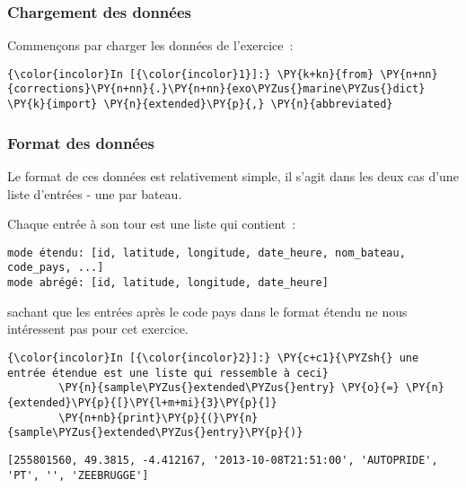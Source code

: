     \hypertarget{chargement-des-donnuxe9es}{%
\subsubsection{Chargement des données}\label{chargement-des-donnuxe9es}}

    Commençons par charger les données de l'exercice~:

    \begin{Verbatim}[commandchars=\\\{\}]
{\color{incolor}In [{\color{incolor}1}]:} \PY{k+kn}{from} \PY{n+nn}{corrections}\PY{n+nn}{.}\PY{n+nn}{exo\PYZus{}marine\PYZus{}dict} \PY{k}{import} \PY{n}{extended}\PY{p}{,} \PY{n}{abbreviated}
\end{Verbatim}


    \hypertarget{format-des-donnuxe9es}{%
\subsubsection{Format des données}\label{format-des-donnuxe9es}}

    Le format de ces données est relativement simple, il s'agit dans les
deux cas d'une liste d'entrées - une par bateau.

Chaque entrée à son tour est une liste qui contient~:

\begin{verbatim}
mode étendu: [id, latitude, longitude, date_heure, nom_bateau, code_pays, ...]
mode abrégé: [id, latitude, longitude, date_heure]
\end{verbatim}

sachant que les entrées après le code pays dans le format étendu ne nous
intéressent pas pour cet exercice.

    \begin{Verbatim}[commandchars=\\\{\}]
{\color{incolor}In [{\color{incolor}2}]:} \PY{c+c1}{\PYZsh{} une entrée étendue est une liste qui ressemble à ceci}
        \PY{n}{sample\PYZus{}extended\PYZus{}entry} \PY{o}{=} \PY{n}{extended}\PY{p}{[}\PY{l+m+mi}{3}\PY{p}{]}
        \PY{n+nb}{print}\PY{p}{(}\PY{n}{sample\PYZus{}extended\PYZus{}entry}\PY{p}{)}
\end{Verbatim}


    \begin{Verbatim}[commandchars=\\\{\}]
[255801560, 49.3815, -4.412167, '2013-10-08T21:51:00', 'AUTOPRIDE', 'PT', '', 'ZEEBRUGGE']

    \end{Verbatim}

